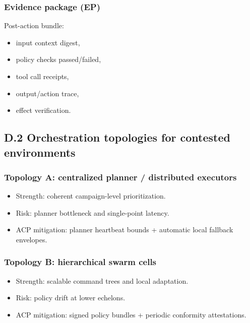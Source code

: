 \documentclass[
]{article}
\providecommand{\tightlist}{%
  \setlength{\itemsep}{0pt}\setlength{\parskip}{0pt}}
\begin{document}
\hypertarget{evidence-package-ep}{%
\subsubsection{Evidence package (EP)}\label{evidence-package-ep}}

Post-action bundle:

\begin{itemize}
\tightlist
\item
  input context digest,
\item
  policy checks passed/failed,
\item
  tool call receipts,
\item
  output/action trace,
\item
  effect verification.
\end{itemize}

\hypertarget{d.2-orchestration-topologies-for-contested-environments}{%
\subsection{D.2 Orchestration topologies for contested
environments}\label{d.2-orchestration-topologies-for-contested-environments}}

\hypertarget{topology-a-centralized-planner-distributed-executors}{%
\subsubsection{Topology A: centralized planner / distributed
executors}\label{topology-a-centralized-planner-distributed-executors}}

\begin{itemize}
\tightlist
\item
  Strength: coherent campaign-level prioritization.
\item
  Risk: planner bottleneck and single-point latency.
\item
  ACP mitigation: planner heartbeat bounds + automatic local fallback
  envelopes.
\end{itemize}

\hypertarget{topology-b-hierarchical-swarm-cells}{%
\subsubsection{Topology B: hierarchical swarm
cells}\label{topology-b-hierarchical-swarm-cells}}

\begin{itemize}
\tightlist
\item
  Strength: scalable command trees and local adaptation.
\item
  Risk: policy drift at lower echelons.
\item
  ACP mitigation: signed policy bundles + periodic conformity
  attestations.
\end{itemize}
\end{document}
